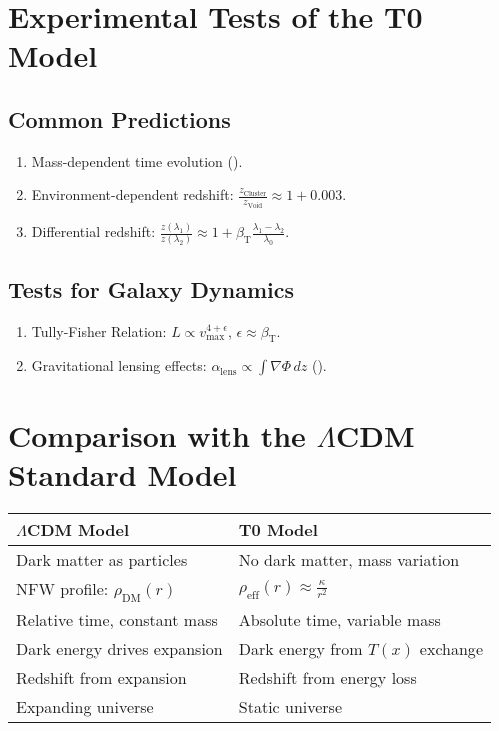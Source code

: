 \documentclass[a4paper,12pt]{article}
\theoremstyle{definition}
\theoremstyle{remark}
\newcommand{\Tfield}{T(x)}
\newcommand{\betaT}{\beta_{\text{T}}}
\begin{document}
	\section{Experimental Tests of the T0 Model}
	
	\subsection{Common Predictions}
	
	\begin{enumerate}
		\item Mass-dependent time evolution (\cite{pascher_photons_2025}).
		\item Environment-dependent redshift: \(\frac{z_{\text{Cluster}}}{z_{\text{Void}}} \approx 1 + 0.003\).
		\item Differential redshift: \(\frac{z(\lambda_1)}{z(\lambda_2)} \approx 1 + \betaT \frac{\lambda_1 - \lambda_2}{\lambda_0}\).
	\end{enumerate}
	
	\subsection{Tests for Galaxy Dynamics}
	
	\begin{enumerate}
		\item Tully-Fisher Relation: \(L \propto v_{\text{max}}^{4 + \epsilon}\), \(\epsilon \approx \betaT\).
		\item Gravitational lensing effects: \(\alpha_{\text{lens}} \propto \int \nabla \Phi \, dz\) (\cite{pascher_galaxies_2025}).
	\end{enumerate}
	
	\section{Comparison with the \(\Lambda\)CDM Standard Model}
	
	\begin{tcolorbox}[colback=yellow!5!white,colframe=yellow!75!black,title=Model Comparison]
		\begin{tabular}{p{}|p{}}
			\toprule
			\textbf{\(\Lambda\)CDM Model} & \textbf{T0 Model} \\
			\midrule
			Dark matter as particles & No dark matter, mass variation \\
			NFW profile: \(\rho_{\text{DM}}(r)\) & \(\rho_{\text{eff}}(r) \approx \frac{\kappa}{r^2}\) \\
			Relative time, constant mass & Absolute time, variable mass \\
			Dark energy drives expansion & Dark energy from \(\Tfield\) exchange \\
			Redshift from expansion & Redshift from energy loss \\
			Expanding universe & Static universe \\
			\bottomrule
		\end{tabular}
	\end{tcolorbox}
	
\end{document}
